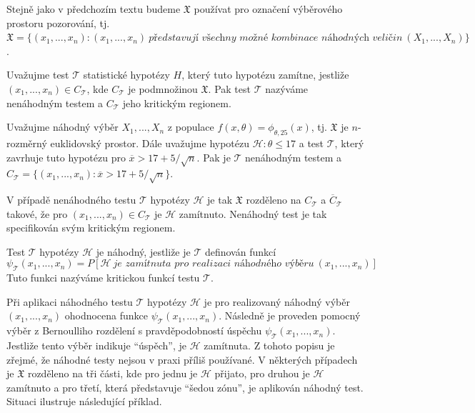 Stejně jako v předchozím textu budeme $\mathfrak{X}$ používat pro označení výběrového prostoru pozorování, tj. $\mathfrak{X} = \{(x_1, ..., x_n) : (x_1, ..., x_n) ~ \textit{představují všechny možné kombinace náhodných veličin}~(X_1, ..., X_n)\}$. 

\begin{definition}
Uvažujme test $\mathscr{T}$ statistické hypotézy $H$, který tuto hypotézu zamítne, jestliže $(x_1, ..., x_n) \in C_{\mathscr{T}}$, kde $C_{\mathscr{T}}$ je podmnožinou $\mathfrak{X}$. Pak test $\mathscr{T}$ nazýváme nenáhodným testem a $C_{\mathscr{T}}$ jeho kritickým regionem.
\end{definition}

\begin{example}
Uvažujme náhodný výběr $X_1, ..., X_n$ z populace $f(x, \theta) = \phi_{\theta, 25}(x)$, tj. $\mathfrak{X}$ je $n$-rozměrný euklidovský prostor. Dále uvažujme hypotézu $\mathscr{H}: \theta \le 17$ a test $\mathscr{T}$, který zavrhuje tuto hypotézu pro $\overline{x} > 17 + 5 / \sqrt{n}$. Pak je $\mathscr{T}$ nenáhodným testem a $C_{\mathscr{T}} = \{(x_1, ..., x_n): \overline{x} > 17 + 5 / \sqrt{n} \}$.
\end{example}

V případě nenáhodného testu $\mathscr{T}$ hypotézy $\mathscr{H}$ je tak $\mathfrak{X}$ rozděleno na $C_{\mathscr{T}}$ a $\overline{C}_{\mathscr{T}}$ takové, že pro $(x_1, ..., x_n) \in C_{\mathscr{T}}$ je $\mathscr{H}$ zamítnuto. Nenáhodný test je tak specifikován svým kritickým regionem.

\begin{definition}
Test $\mathscr{T}$ hypotézy $\mathscr{H}$ je náhodný, jestliže je $\mathscr{T}$ definován funkcí\
\begin{equation*}
\psi_{\mathscr{T}}(x_1, ..., x_n) = P[\mathscr{H}~\textit{je zamítnuta pro realizaci náhodného výběru}~(x_1, ..., x_n)]
\end{equation*}
Tuto funkci nazýváme kritickou funkcí testu $\mathscr{T}$.
\end{definition}

Při aplikaci náhodného testu $\mathscr{T}$ hypotézy $\mathscr{H}$ je pro realizovaný náhodný výběr $(x_1, ..., x_n)$ ohodnocena funkce $\psi_{\mathscr{T}}(x_1, ..., x_n)$. Následně je proveden pomocný výběr z Bernoulliho rozdělení s pravděpodobností úspěchu $\psi_{\mathscr{T}}(x_1, ..., x_n)$. Jestliže tento výběr indikuje ``úspěch'', je $\mathscr{H}$ zamítnuta. Z tohoto popisu je zřejmé, že náhodné testy nejsou v praxi příliš používané. V některých případech je $\mathfrak{X}$ rozděleno na tři části, kde pro jednu je $\mathscr{H}$ přijato, pro druhou je $\mathscr{H}$ zamítnuto a pro třetí, která představuje ``šedou zónu'', je aplikován náhodný test. Situaci ilustruje následující příklad.

